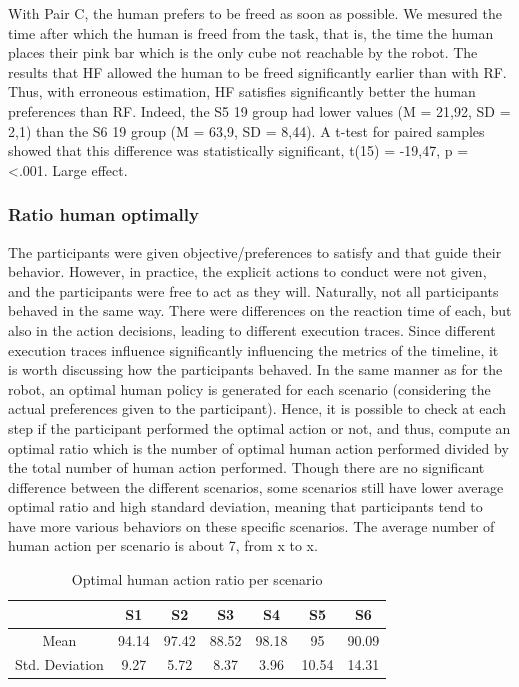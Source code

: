 With Pair C, the human prefers to be freed as soon as possible. We mesured the time after which the human is freed from the task, that is, the time the human places their pink bar which is the only cube not reachable by the robot. The results that HF allowed the human to be freed significantly earlier than with RF. Thus, with erroneous estimation, HF satisfies significantly better the human preferences than RF.
Indeed, the S5 19 group had lower values (M = 21,92, SD = 2,1) than the S6 19 group (M = 63,9, SD = 8,44). A t-test for paired samples showed that this difference was statistically significant, t(15) = -19,47, p = <.001. Large effect. 

\subsubsection*{Ratio human optimally}
The participants were given objective/preferences to satisfy and that guide their behavior. However, in practice, the explicit actions to conduct were not given, and the participants were free to act as they will. Naturally, not all participants behaved in the same way. There were differences on the reaction time of each, but also in the action decisions, leading to different execution traces. Since different execution traces influence significantly influencing the metrics of the timeline, it is worth discussing how the participants behaved.
In the same manner as for the robot, an optimal human policy is generated for each scenario (considering the actual preferences given to the participant). Hence, it is possible to check at each step if the participant performed the optimal action or not, and thus, compute an optimal ratio which is the number of optimal human action performed divided by the total number of human action performed.  
Though there are no significant difference between the different scenarios, some scenarios still have lower average optimal ratio and high standard deviation, meaning that participants tend to have more various behaviors on these specific scenarios. 
The average number of human action per scenario is about 7, from x to x. 

\begin{table}
    \caption{Optimal human action ratio per scenario}
    \begin{center}
    \begin{tabular}{c|c|c|c|c|c|c|}
        \cline{2-7}
                                                & S1    & S2    & S3    & S4    & S5    & S6\\
        \hline
        \multicolumn{1}{|c|}{Mean}              & 94.14 & 97.42 & 88.52 & 98.18 & 95    & 90.09 \\
        \hline
        \multicolumn{1}{|c|}{Std. Deviation}    & 9.27  & 5.72  & 8.37  & 3.96  & 10.54 & 14.31 \\
        \hline
    \end{tabular}
    \end{center}
    \label{tab:optimal_human_ratio}
\end{table}

